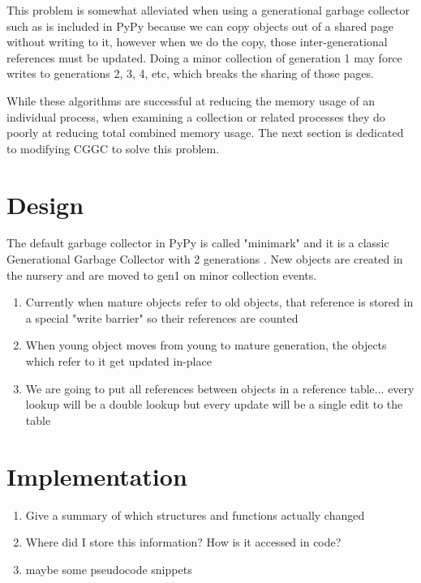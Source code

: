 \documentclass{article}
\begin{document}
  This problem is somewhat alleviated when using a generational garbage collector such as is included in PyPy because we can copy objects out of a shared page without writing to it, however when we do the copy, those inter-generational references must be updated.  Doing a minor collection of generation 1 may force writes to generations 2, 3, 4, etc, which breaks the sharing of those pages.  

  While these algorithms are successful at reducing the memory usage of an individual process, when examining a collection or related processes they do poorly at reducing total combined memory usage.  The next section is dedicated to modifying CGGC to solve this problem.  

  \section{Design}

  The default garbage collector in PyPy is called "minimark" and it is a classic Generational Garbage Collector with 2 generations \cite{pypy-doc}.  New objects are created in the nursery and are moved to gen1 on minor collection events.  

  \begin{enumerate}
	\item Currently when mature objects refer to old objects, that reference is stored in a special "write barrier" so their references are counted
	\item When young object moves from young to mature generation, the objects which refer to it get updated in-place
	\item We are going to put all references between objects in a reference table... every lookup will be a double lookup but every update will be a single edit to the table
  \end{enumerate}

  \section{Implementation}
  \begin{enumerate}
	\item Give a summary of which structures and functions actually changed
	\item Where did I store this information?  How is it accessed in code?  
	\item maybe some pseudocode snippets
  \end{enumerate}
\end{document}
